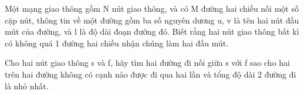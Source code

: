 Một mạng giao thông gồm N nút giao thông, và có M đường hai chiều nối một số cặp nút, thông tin về một đường gồm ba số nguyên dương u, v là tên hai nút đầu mút của đường, và l là độ dài đoạn đường đó. Biết rằng hai nút giao thông bất kì có không quá 1 đường hai chiều nhận chúng làm hai đầu mút.


Cho hai nút giao thông s và f, hãy tìm hai đường đi nối giữa s với f sao cho hai trên hai đường không có cạnh nào được đi qua hai lần và tổng độ dài 2 đường đi là nhỏ nhất.
